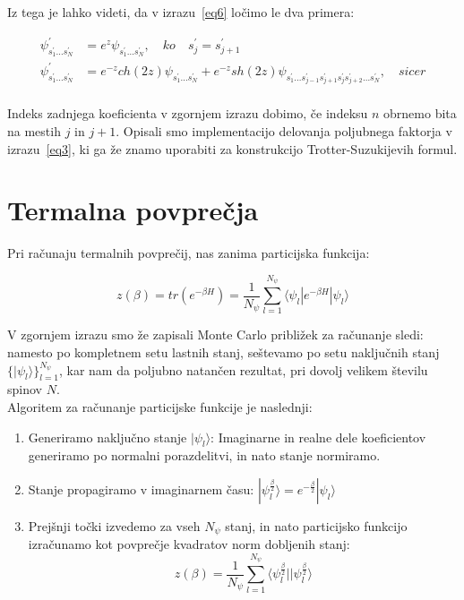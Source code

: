 \documentclass[a4paper]{article}
\newcommand{\bra}[1]{\langle#1|}
\newcommand{\ket}[1]{|#1\rangle}
\begin{document}
    Iz tega je lahko videti, da v izrazu~\ref{eq6} ločimo le dva primera:

    \begin{equation}\label{eq9}
    \begin{split}
        \psi_{s_1^\prime \ldots s_N^\prime}^\prime &= e^{z} \psi_{s_1^\prime \ldots s_N^\prime},
        \quad ko \quad s_j^\prime = s_{j+1}^\prime\\
        \psi_{s_1^\prime \ldots s_N^\prime}^\prime &= e^{-z}ch(2z) \psi_{s_1^\prime \ldots s_N^\prime} + e^{-z}sh(2z)
        \psi_{s_1^\prime \ldots s_{j-1}^\prime s_{j+1}^\prime s_j^\prime s_{j+2}^\prime \ldots s_N^\prime},
        \quad sicer\\
    \end{split}
    \end{equation}

    Indeks zadnjega koeficienta v zgornjem izrazu dobimo, če indeksu $n$ obrnemo bita na mestih $j$ in $j+1$.
    Opisali smo implementacijo delovanja poljubnega faktorja v izrazu~\ref{eq3}, ki ga že znamo uporabiti za
    konstrukcijo Trotter-Suzukijevih formul.

    \section{Termalna povprečja}

    Pri računaju termalnih povprečij, nas zanima particijska funkcija:

    \begin{equation}\label{eq10}
        z(\beta) = tr \left( e^{-\beta H} \right)
        = \frac{1}{N_\psi} \sum_{l=1}^{N_\psi} \bra{\psi_l} e^{-\beta H} \ket{\psi_l}
    \end{equation}

    V zgornjem izrazu smo že zapisali Monte Carlo približek za računanje sledi: namesto po kompletnem setu lastnih
    stanj, seštevamo po setu naključnih stanj $\{ \ket{\psi_l} \}_{l=1}^{N_{\psi}}$, kar nam da poljubno natančen
    rezultat, pri dovolj velikem številu spinov $N$.\\

    Algoritem za računanje particijske funkcije je naslednji:

    \begin{enumerate}
        \item Generiramo naključno stanje $\ket{\psi_l}$: Imaginarne in realne dele koeficientov generiramo po
        normalni porazdelitvi, in nato stanje normiramo.
        \item Stanje propagiramo v imaginarnem času:
        $\ket{\psi_l^{\frac{\beta}{2}}} = e^{-\frac{\beta}{2}} \ket{\psi_l}$
        \item Prejšnji točki izvedemo za vseh $N_\psi$ stanj, in nato particijsko funkcijo izračunamo kot povprečje
        kvadratov norm dobljenih stanj:
        \begin{equation}\label{eq11}
        z(\beta) = \frac{1}{N_\psi} \sum_{l=1}^{N_\psi} \bra{\psi_l^{\frac{\beta}{2}}} \ket{\psi_l^{\frac{\beta}{2}}}
        \end{equation}
    \end{enumerate}
\end{document}
